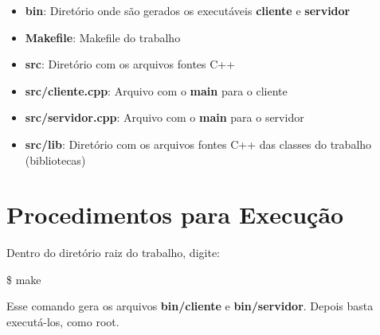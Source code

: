 \documentclass{article}
\begin{document}
\begin{itemize}

	\item \textbf{bin}: Diretório onde são gerados os executáveis \textbf{cliente} e \textbf{servidor}
	
	\item \textbf{Makefile}: Makefile do trabalho
	
	\item \textbf{src}: Diretório com os arquivos fontes C++
	
	\item \textbf{src/cliente.cpp}: Arquivo com o \textbf{main} para o cliente
	
	\item \textbf{src/servidor.cpp}: Arquivo com o \textbf{main} para o servidor
	
	\item \textbf{src/lib}: Diretório com os arquivos fontes C++ das classes do trabalho (bibliotecas)

\end{itemize}



\section{Procedimentos para Execução}


Dentro do diretório raiz do trabalho, digite:

\vspace{0.5cm}

\$ make

\vspace{0.4cm}

Esse comando gera os arquivos \textbf{bin/cliente} e \textbf{bin/servidor}. Depois basta executá-los, como root.
\end{document}
